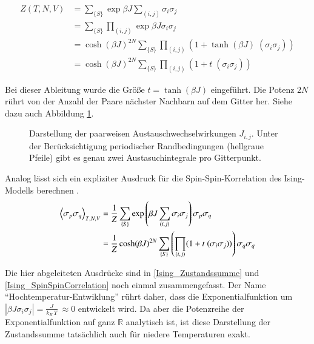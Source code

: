 \begin{align} 
    Z(T,N,V) 
    &  = \sum_{\{S\}} \exp{\beta J \sum_{(i,j)} \sigma_i \sigma_j } \nonumber \\
    &  = \sum_{\{S\}} \prod_{(i,j)} \exp{\beta J \sigma_i \sigma_j } \nonumber\\
    &  = \cosh(\beta J)^{2N} \sum_{\{S\}} \prod_{(i,j)} (1 +  \tanh(\beta J) \; (\sigma_i \sigma_j)) \nonumber \\
    &  = \cosh(\beta J)^{2N} \sum_{\{S\}} \prod_{(i,j)} (1 +  t \; (\sigma_i \sigma_j))
\end{align}

\noindent Bei dieser Ableitung wurde die Größe $t = \tanh(\beta J)$ eingeführt. Die Potenz $2N$ rührt von der Anzahl der Paare nächster Nachbarn auf dem Gitter her. Siehe dazu auch Abbildung \ref{Abb: grid}.
\begin{figure}[h]
    \centering
    
    \caption{Darstellung der paarweisen Austauschwechselwirkungen $J_{i,j}$. Unter der Berücksichtigung periodischer Randbedingungen (hellgraue Pfeile) gibt es genau zwei Austasuchintegrale pro Gitterpunkt.}  \label{Abb: grid}
\end{figure}

\noindent Analog lässt sich ein expliziter Ausdruck für die Spin-Spin-Korrelation des Ising-Modells berechnen \cite{StatPhys_Nolting_K4}.
\begin{align} 
    \left\langle \sigma_{p} \sigma_{q}  \right\rangle_{T,N,V}  
    & = \frac{1}{Z} \sum_{\{S\}} \mathrm{exp}\left( \beta J \sum_{(i,j)} \sigma_i \sigma_j  \right) \sigma_{p} \sigma_{q} \nonumber\\
    & = \frac{1}{Z} \cosh(\beta J)^{2N} \sum_{\{S\}} \left(\prod_{(i,j)} (1 +  t \; (\sigma_i \sigma_j) )\right) \sigma_{q} \sigma_{q} 
\end{align}

\noindent Die hier abgeleiteten Ausdrücke sind in  \eqref{Ising_Zustandssumme} und \eqref{Ising_SpinSpinCorrelation} noch einmal zusammengefasst. Der Name ``Hochtemperatur-Entwiklung'' rührt daher, dass die Exponentialfunktion um $|\beta J \sigma_i \sigma_j| = \frac{J}{k_B\,T}\ \approx 0 $ entwickelt wird. Da aber die Potenzreihe der Exponentialfunktion auf ganz $\mathbb R$ analytisch ist, ist diese Darstellung der Zustandssumme tatsächlich auch für niedere Temperaturen exakt. 

